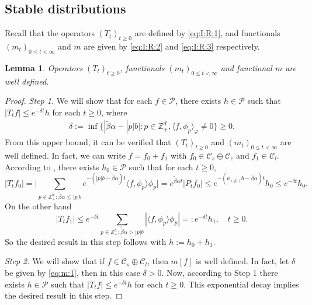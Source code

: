 \documentclass[12pt,a4paper]{amsart}
\theoremstyle{plain}
\newtheorem{lem}[thm]{Lemma}
\theoremstyle{definition}
\numberwithin{equation}{section}
\begin{document}
\subsection{Stable distributions}
\label{sec: stable distributions}
Recall that the operators $(T_t)_{t\geq 0}$ are defined by \eqref{eq:I:R:1}, and functionals $(m_{t})_{0\leq t< \infty}$ and $m$ are given by \eqref{eq:I:R:2} and \eqref{eq:I:R:3} respectively.
\begin{lem}
  \label{lem:m}
  Operators $(T_t)_{t\geq 0}$, functionals $(m_{t})_{0\leq t< \infty}$ and functional $m$ are well defined.
\end{lem}
\begin{proof}
  \emph{Step 1.} We will show that for each $f \in \mathcal P$, there exists $h \in \mathcal P$ such that $ |T_tf| \leq  e^{- \delta t} h$ for each $t\geq 0$, where
  \begin{align}
    \label{eq:m:1}
    \delta
    := \inf \big\{ |\tilde \beta \alpha - |p|b| : p \in \mathbb Z_+^d, \langle f, \phi_p\rangle_\varphi \neq 0 \big\}
    \geq 0.
  \end{align}
  From this upper bound, it can be verified that $(T_t)_{t\geq 0}$ and $(m_{t})_{0 \leq t < \infty}$ are well defined.
  In fact, we can write $f = f_0 + f_1$ with $f_0\in \mathcal C_s \oplus \mathcal C_c$ and $f_1 \in \mathcal C_l$.
  According to \cite[Lemma 2.7]{MarksMilos2018CLT}, there exists $h_0 \in \mathcal P$ such that for each $t\geq 0$,
  \[
    |T_t f_0|
    = \Big| \sum_{p \in  \mathbb Z_+^d: \tilde \beta \alpha \leq |p|b } e^{- ( |p| b - \tilde \beta \alpha ) t} \langle f, \phi_p \rangle \phi_p \Big|
    = e^{\tilde \beta \alpha t} | P_t f_0 |
    \leq e^{- ( \kappa_{(f_0)} b - \tilde \beta \alpha) t} h_0
    \leq e^{- \delta t} h_0.
  \]
  On the other hand
  \[
    |T_t f_1|
    \leq e^{- \delta t}\sum_{p \in \mathbb Z_+^d : \tilde \beta \alpha > |p|b}
    |\langle f, \phi_p \rangle \phi_p|
    =: e^{- \delta t} h_1,
    \quad t\geq 0.
  \]
  So the desired result in this step follows with $h := h_0 + h_1$.

  \emph{Step 2.} We will show that if $f \in \mathcal C_s \oplus \mathcal C_l$, then $m[f]$ is well defined.
  In fact, let $\delta$ be given by \eqref{eq:m:1}, then in this case $\delta > 0$.
  Now, according to Step 1 there exists $h \in \mathcal P$ such that $|T_tf| \leq e^{- \delta t} h$ for each $t\geq 0$.
  This exponential decay implies the desired result in this step.


\end{proof}
\end{document}
